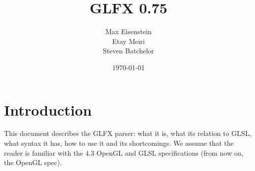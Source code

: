 \documentclass[11pt,a4paper,final,titlepage]{article}
\begin{document}
\title{GLFX 0.75}
\author{Max Eisenstein\\Etay Meiri\\Steven Batchelor}
\date{\today}
\maketitle

\listoffixmes

\tableofcontents

\pagebreak

\section{Introduction}\label{sec:intro}
This document describes the GLFX parser: what it is, what its relation to GLSL,
what syntax it has, how to use it and its shortcomings. We assume that the reader is familiar with the
4.3 OpenGL and GLSL specifications (from now on, the OpenGL spec).
\end{document}
